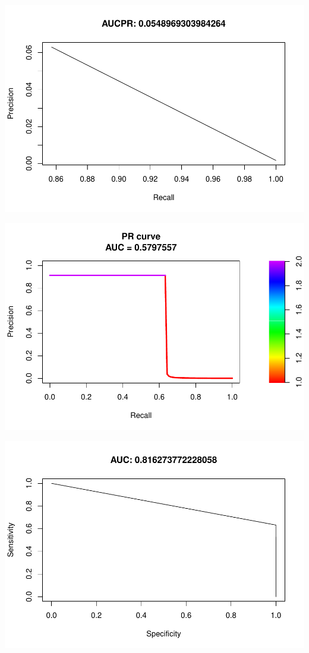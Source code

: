 \documentclass[]{article}
\begin{document}
\begin{center}\includegraphics{Credit_Card_Fraud_Detection_Project_Report_files/figure-latex/unnamed-chunk-25-9} \end{center}

\begin{center}\includegraphics{Credit_Card_Fraud_Detection_Project_Report_files/figure-latex/unnamed-chunk-25-10} \end{center}

\begin{center}\includegraphics{Credit_Card_Fraud_Detection_Project_Report_files/figure-latex/unnamed-chunk-25-11} \end{center}
\end{document}
